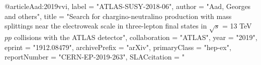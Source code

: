 @article{Aad:2019vvi,
      label          = "ATLAS-SUSY-2018-06",
      author         = "Aad, Georges and others",
      title          = "{Search for chargino-neutralino production with mass
                        splittings near the electroweak scale in three-lepton
                        final states in $\sqrt{s}$ = 13 TeV $pp$ collisions with
                        the ATLAS detector}",
      collaboration  = "ATLAS",
      year           = "2019",
      eprint         = "1912.08479",
      archivePrefix  = "arXiv",
      primaryClass   = "hep-ex",
      reportNumber   = "CERN-EP-2019-263",
      SLACcitation   = "%
}

